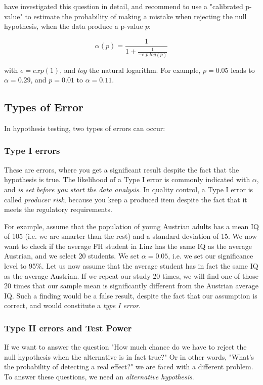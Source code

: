 \cite{sellke2001} have investigated this question in detail, and recommend to use a "calibrated p-value" to estimate the probability of making a mistake when rejecting the null hypothesis, when the data produce a p-value $p$:

\begin{equation}\label{eq:pFallacy}
    \alpha(p)= \frac{1}{1 + \frac{1}{-e \; p \; log(p)}}
\end{equation}

with $e=exp(1)$, and $log$ the natural logarithm. For example, $p=0.05$ leads to $\alpha=0.29$, and $p=0.01$ to $\alpha=0.11$.

\subsection{Types of Error}
In hypothesis testing, two types of errors can occur:

\subsubsection{Type I errors}  
These are errors, where you get a significant result despite the fact that the hypothesis is true. The likelihood of a Type I error is commonly indicated with $\alpha$, and \emph{is set before you start the data analysis}. In quality control, a Type I error is called \emph{producer risk}, because you keep a produced item despite the fact that it meets the regulatory requirements.

For example, assume that the population of young Austrian adults has a mean IQ of 105 (i.e. we are smarter than the rest) and a standard deviation of 15. We now want to check if the average FH student in Linz has the same IQ as the average Austrian, and we select 20 students. We set $\alpha=0.05$, i.e. we set our significance level to 95\%.
Let us now assume that the average student has in fact the same IQ as the average Austrian. If we repeat our study 20 times, we will find one of those 20 times that our sample mean is significantly different from the Austrian average IQ. Such a finding would be a false result, despite the fact that our assumption is correct, and would constitute a \emph{type I error}.

\subsubsection{Type II errors and Test Power}
If we want to answer the question "How much chance do we have to reject the null hypothesis when the alternative is in fact true?" Or in other words, "What’s the probability of detecting a real effect?" we are faced with a different problem. To answer these questions, we need an \emph{alternative hypothesis}.

